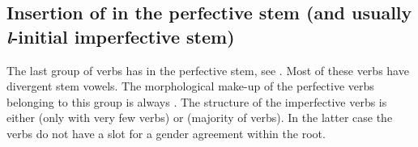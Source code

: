 
\subsection{Insertion of  in the perfective stem (and usually \textit{l}-initial imperfective stem)}
\label{ssec:Insertion of l in the perfective stem}

The last group of verbs has  in the perfective stem, see . Most of these verbs have divergent stem vowels. The morphological make-up of the perfective verbs belonging to this group is always . The structure of the imperfective verbs is either  (only with very few verbs) or  (majority of verbs). In the latter case the verbs do not have a slot for a gender agreement within the root.
%
